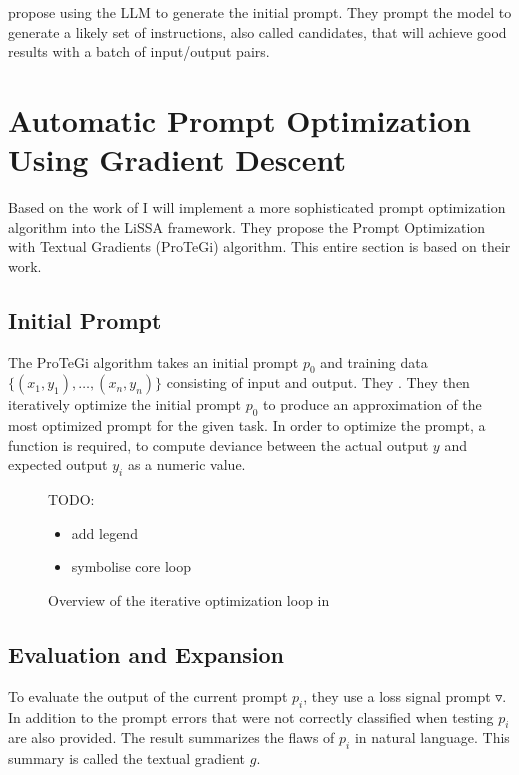  propose using the LLM to generate the initial prompt. They prompt the model to generate a likely set of instructions, also called candidates, that will achieve good results with a batch of input/output pairs.




\section{Automatic Prompt Optimization Using Gradient Descent}
\label{sec:gradient_descent}
Based on the work of  I will implement a more sophisticated prompt optimization algorithm into the LiSSA framework. They propose the Prompt Optimization with Textual Gradients (ProTeGi) algorithm. This entire section is based on their work.

\subsection{Initial Prompt}
The ProTeGi algorithm takes an initial prompt $p_0$ and training data $\{(x_1, y_1), \dots, (x_n, y_n)\}$ consisting of input and output. They . They then iteratively optimize the initial prompt $p_0$ to produce an approximation of the most optimized prompt for the given task. In order to optimize the prompt, a function is required, to compute deviance between the actual output $y$ and expected output $y_i$ as a numeric value.

\begin{figure}[h]
\centering

\caption{Overview of the iterative optimization loop in \cite{pryzant2023AutomaticPrompt}}
\label{fig:gradient_descent}
TODO: 
\begin{itemize}
    \item add legend
    \item symbolise core loop
\end{itemize}
\end{figure}


\subsection{Evaluation and Expansion}
To evaluate the output of the current prompt $p_i$, they use a loss signal prompt $\triangledown$. In addition to the prompt errors that were not correctly classified when testing $p_i$ are also provided. The result summarizes the flaws of $p_i$ in natural language. This summary is called the textual gradient $g$.

